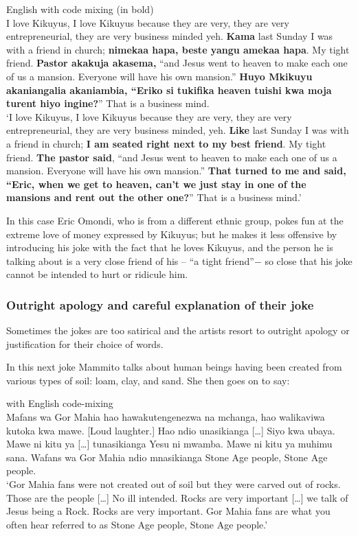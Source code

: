 \documentclass[output=paper]{langsci/langscibook}
\begin{document}
\ea\label{ex:muaka:14}
{English with  code mixing (in bold)}\\
\smallskip
I love Kikuyus, I love Kikuyus because they are very, they are very entrepreneurial, they are very business minded yeh. \textbf{Kama} last Sunday I was with a  friend in church; \textbf{nimekaa hapa, beste yangu amekaa hapa}. My tight friend. \textbf{Pastor akakuja akasema,} “and Jesus went to heaven to make each one of us a mansion. Everyone will have his own mansion.” \textbf{Huyo Mkikuyu akaniangalia akaniambia, “Eriko si tukifika heaven tuishi kwa moja turent hiyo ingine?}” That is a business mind. \\
\glt ‘I love Kikuyus, I love Kikuyus because they are very, they are very entrepreneurial, they are very business minded, yeh. \textbf{Like} last Sunday I was with a  friend in church; \textbf{I am seated right next to my best friend}. My tight friend. \textbf{The pastor said}, “and Jesus went to heaven to make each one of us a mansion. Everyone will have his own mansion.” \textbf{That  turned to me and said, “Eric, when we get to heaven, can’t we just stay in one of the mansions and rent out the other one?}” That is a business mind.’ \citep{Churchill2011}
\z

In this case Eric Omondi, who is from a different ethnic group, pokes fun at the extreme love of money expressed by Kikuyus; but he makes it less offensive by introducing his joke with the fact that he loves Kikuyus, and the person he is talking about is a very close friend of his – “a tight friend”$-$ so close that his joke cannot be intended to hurt or ridicule him.

\subsubsection{Outright apology and careful explanation of their joke }

Sometimes the jokes are too satirical and the artists resort to outright apology or justification for their choice of words. 

In this next joke Mammito talks about human beings having been created from various types of soil: loam, clay, and sand. She then goes on to say:

\ea
{ with English code-mixing}\\
\smallskip
Mafans wa Gor Mahia hao hawakutengenezwa na mchanga, hao walikaviwa kutoka kwa mawe. \textup{[Loud laughter.]} Hao ndio unasikianga […] Siyo kwa ubaya. Mawe ni kitu ya […] tunasikianga Yesu ni mwamba. Mawe ni kitu ya muhimu sana. Wafans wa Gor Mahia ndio mnasikianga Stone Age people, Stone Age people.\\
\glt ‘Gor Mahia fans were not created out of soil but they were carved out of rocks. Those are the people […] No ill intended. Rocks are very important […] we talk of Jesus being a Rock. Rocks are very important. Gor Mahia fans are what you often hear referred to as Stone Age people, Stone Age people.’ \citep{ChurchillRaw2014}
\z
\end{document}
